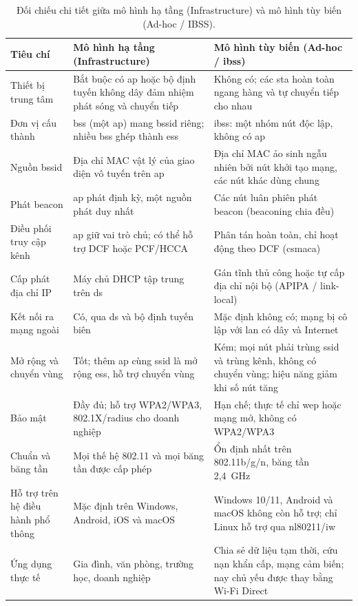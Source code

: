 \begin{table}[htbp]
  \centering\footnotesize
  \caption{Đối chiếu chi tiết giữa mô hình hạ tầng (Infrastructure) và mô hình
  tùy biến (Ad-hoc / IBSS).}
  \label{tab:infra-adhoc-detail}
  \begin{tabularx}{\linewidth}{@{} L{0.75} L{1.15} L{1.1} @{}}
    \toprule
    \textbf{Tiêu chí} & \textbf{Mô hình hạ tầng (Infrastructure)} & \textbf{Mô hình tùy biến (Ad-hoc / \ac{ibss})} \\
    \midrule
    Thiết bị trung tâm & Bắt buộc có \ac{ap} hoặc bộ định tuyến không dây đảm
      nhiệm phát sóng và chuyển tiếp & Không có; các \ac{sta} hoàn toàn ngang
      hàng và tự chuyển tiếp cho nhau \\
    Đơn vị cấu thành & \ac{bss} (một \ac{ap}) mang \ac{bssid} riêng; nhiều
      \ac{bss} ghép thành \ac{ess} & \ac{ibss}: một nhóm nút độc lập, không có
      \ac{ap} \\
    Nguồn \ac{bssid} & Địa chỉ MAC vật lý của giao diện vô tuyến trên \ac{ap} &
      Địa chỉ MAC ảo sinh ngẫu nhiên bởi nút khởi tạo mạng, các nút khác dùng
      chung \\
    Phát beacon & \ac{ap} phát định kỳ, một nguồn phát duy nhất & Các nút luân
      phiên phát beacon (beaconing chia đều) \\
    Điều phối truy cập kênh & \ac{ap} giữ vai trò chủ; có thể hỗ trợ DCF hoặc
      PCF/HCCA & Phân tán hoàn toàn, chỉ hoạt động theo DCF (\ac{csmaca}) \\
    Cấp phát địa chỉ IP & Máy chủ DHCP tập trung trên \ac{ds} & Gán tĩnh thủ
      công hoặc tự cấp địa chỉ nội bộ (APIPA / link-local) \\
    Kết nối ra mạng ngoài & Có, qua \ac{ds} và bộ định tuyến biên & Mặc định
      không có; mạng bị cô lập với \ac{lan} có dây và Internet \\
    Mở rộng và chuyển vùng & Tốt; thêm \ac{ap} cùng \ac{ssid} là mở rộng
      \ac{ess}, hỗ trợ chuyển vùng & Kém; mọi nút phải trùng \ac{ssid} và trùng
      kênh, không có chuyển vùng; hiệu năng giảm khi số nút tăng \\
    Bảo mật & Đầy đủ; hỗ trợ WPA2/WPA3, 802.1X/\ac{radius} cho doanh nghiệp &
      Hạn chế; thực tế chỉ \ac{wep} hoặc mạng mở, không có WPA2/WPA3 \\
    Chuẩn và băng tần & Mọi thế hệ 802.11 và mọi băng tần được cấp phép & Ổn
      định nhất trên 802.11b/g/n, băng tần 2,4~GHz \\
    Hỗ trợ trên hệ điều hành phổ thông & Mặc định trên Windows, Android, iOS và
      macOS & Windows 10/11, Android và macOS không còn hỗ trợ; chỉ Linux hỗ trợ
      qua nl80211/iw \\
    Ứng dụng thực tế & Gia đình, văn phòng, trường học, doanh nghiệp & Chia sẻ
      dữ liệu tạm thời, cứu nạn khẩn cấp, mạng cảm biến; nay chủ yếu được thay
      bằng Wi-Fi Direct \\
    \bottomrule
  \end{tabularx}
\end{table}


